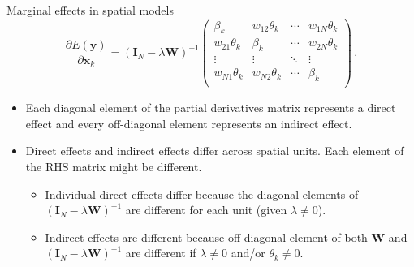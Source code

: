 \documentclass{beamer}
\begin{document}
\begin{frame}{Marginal effects in spatial models}
\begin{equation*}
\frac{\partial E(\bm{y})}{\partial \bm{x}_k}
    =(\bm{I}_N - \lambda \bm{W})^{-1}
	\begin{pmatrix}
		\beta_{k} & w_{12}\theta_{k}& \cdots & w_{1N}\theta_{k}\\
		w_{21}\theta_{k}& \beta_{k} & \cdots & w_{2N}\theta_{k}\\
		\vdots & \vdots & \ddots & \vdots \\
		w_{N1}\theta_{k} & w_{N2}\theta_{k} & \cdots & \beta_{k} \\
	\end{pmatrix}\,. 
\end{equation*}
\begin{itemize}
	\item Each diagonal element of the partial derivatives matrix  represents a direct effect and every off-diagonal element represents an indirect effect.
	\smallskip
	\item Direct effects and indirect effects differ across spatial units. Each element of the RHS matrix might be different. 
	\smallskip
	\begin{itemize}
	    \item Individual direct effects differ because the diagonal elements of $(\bm{I}_N - \lambda \bm{W})^{-1}$ are different for each unit (given $\lambda \neq 0$).
	    	\smallskip
	    \item Indirect effects are different because off-diagonal element of both $\bm{W}$ and $(\bm{I}_N - \lambda \bm{W})^{-1}$ are different if $\lambda \neq 0$ and/or $\theta_k \neq 0$.
	\end{itemize} 
\end{itemize}	
\end{frame}
\end{document}
